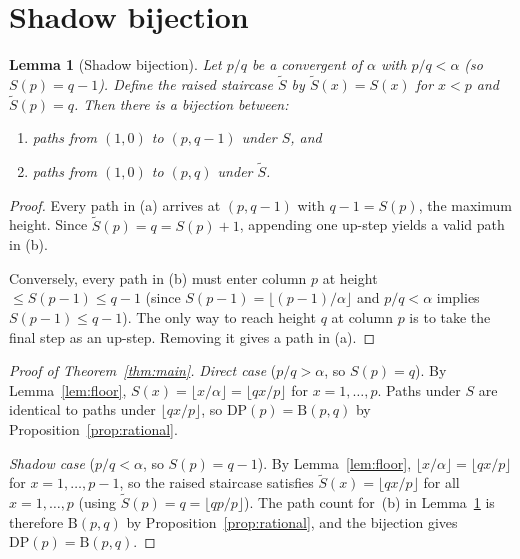 \documentclass[11pt]{article}
\newtheorem{lemma}[theorem]{Lemma}
\theoremstyle{definition}
\theoremstyle{remark}
\newcommand{\floor}[1]{\lfloor #1 \rfloor}
\newcommand{\B}{\mathrm{B}}
\begin{document}
\section{Shadow bijection}\label{sec:shadow}

\begin{lemma}[Shadow bijection]\label{lem:shadow}
Let $p/q$ be a convergent of $\alpha$ with $p/q < \alpha$ (so $S(p) = q - 1$).
Define the \emph{raised staircase} $\tilde{S}$ by $\tilde{S}(x) = S(x)$ for $x < p$ and $\tilde{S}(p) = q$.
Then there is a bijection between:
\begin{enumerate}
  \item[(a)] paths from $(1,0)$ to $(p, q-1)$ under $S$, and
  \item[(b)] paths from $(1,0)$ to $(p, q)$ under $\tilde{S}$.
\end{enumerate}
\end{lemma}

\begin{proof}
Every path in (a) arrives at $(p, q-1)$ with $q-1 = S(p)$, the maximum height.
Since $\tilde{S}(p) = q = S(p) + 1$, appending one up-step yields a valid path in (b).

Conversely, every path in (b) must enter column $p$ at height $\leq S(p-1) \leq q - 1$ (since $S(p-1) = \floor{(p-1)/\alpha}$ and $p/q < \alpha$ implies $S(p-1) \leq q-1$). The only way to reach height $q$ at column $p$ is to take the final step as an up-step. Removing it gives a path in (a).
\end{proof}

\begin{proof}[Proof of Theorem~\ref{thm:main}]
\emph{Direct case} ($p/q > \alpha$, so $S(p) = q$).
By Lemma~\ref{lem:floor}, $S(x) = \floor{x/\alpha} = \floor{qx/p}$ for $x = 1, \ldots, p$.
Paths under $S$ are identical to paths under $\floor{qx/p}$, so $\mathrm{DP}(p) = \B(p, q)$ by Proposition~\ref{prop:rational}.

\emph{Shadow case} ($p/q < \alpha$, so $S(p) = q - 1$).
By Lemma~\ref{lem:floor}, $\floor{x/\alpha} = \floor{qx/p}$ for $x = 1, \ldots, p-1$, so the raised staircase satisfies $\tilde{S}(x) = \floor{qx/p}$ for all $x = 1, \ldots, p$ (using $\tilde{S}(p) = q = \floor{qp/p}$).
The path count for~(b) in Lemma~\ref{lem:shadow} is therefore $\B(p,q)$ by Proposition~\ref{prop:rational}, and the bijection gives $\mathrm{DP}(p) = \B(p, q)$.
\end{proof}
\end{document}
